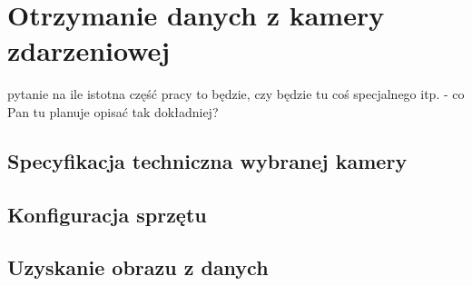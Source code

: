 \chapter{Otrzymanie danych z kamery zdarzeniowej}
\label{cha:kamera}

pytanie na ile istotna część pracy to będzie, czy będzie tu coś specjalnego itp. - co Pan tu planuje opisać tak dokładniej?


\section{Specyfikacja techniczna wybranej kamery}
\label{sec:tech}

\section{Konfiguracja sprzętu}
\label{sec:konfiguracja}

\section{Uzyskanie obrazu z danych}
\label{sec:obraz}
